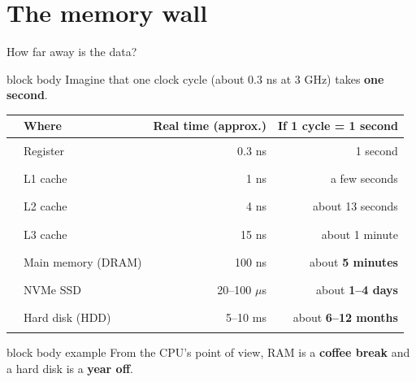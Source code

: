 \documentclass[aspectratio=169,10pt]{beamer}
\newcommand{\keymsg}[1]{%
  \begin{beamercolorbox}[rounded=true,sep=0.1cm,wd=\textwidth]{block body example}
    \centering\footnotesize #1
  \end{beamercolorbox}}
\begin{document}
\section{The memory wall}

\begin{frame}{How far away is the data?}
  \begin{beamercolorbox}[rounded=true,sep=0.12cm,wd=\textwidth]{block body}
    \centering\small Imagine that one clock cycle (about 0.3 ns at 3 GHz) takes \textbf{one second}.
  \end{beamercolorbox}
  \vspace{0.15cm}
  \begin{center}
    \footnotesize
    \renewcommand{\arraystretch}{1.18}
    \begin{tabular}{llrr}
      \toprule
      & \textbf{Where} & \textbf{Real time (approx.)} & \textbf{If 1 cycle = 1 second} \\
      \midrule
      \textcolor{cReg}{\rule{0.25cm}{0.25cm}}   & Register            & 0.3 ns          & 1 second \\
      \textcolor{cCache}{\rule{0.25cm}{0.25cm}} & L1 cache            & 1 ns            & a few seconds \\
      \textcolor{cCache}{\rule{0.25cm}{0.25cm}} & L2 cache            & 4 ns            & about 13 seconds \\
      \textcolor{cCache}{\rule{0.25cm}{0.25cm}} & L3 cache            & 15 ns           & about 1 minute \\
      \textcolor{cRAM}{\rule{0.25cm}{0.25cm}}   & Main memory (DRAM)  & 100 ns          & about \textbf{5 minutes} \\
      \textcolor{cDisk}{\rule{0.25cm}{0.25cm}}  & NVMe SSD            & 20--100 $\mu$s      & about \textbf{1--4 days} \\
      \textcolor{cDisk}{\rule{0.25cm}{0.25cm}}  & Hard disk (HDD)     & 5--10 ms        & about \textbf{6--12 months} \\
      \bottomrule
    \end{tabular}
  \end{center}
  \vfill
  \keymsg{From the CPU's point of view, RAM is a \textbf{coffee break} and a hard disk is a \textbf{year off}.}
\end{frame}
\end{document}
